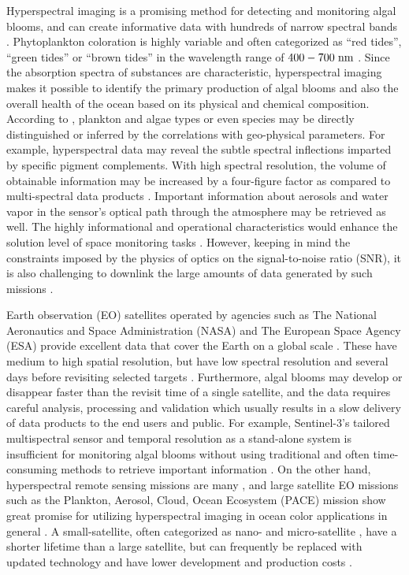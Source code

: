 Hyperspectral imaging is a promising method for detecting and monitoring algal blooms, and can create informative data with hundreds of narrow spectral bands \cite{Kutser2006}. Phytoplankton coloration is highly variable and often categorized as “red tides”, “green tides” or “brown tides” in the wavelength range of $400-700 \hspace{3pt} \rm{nm}$ \cite{Kutser2006, Johnsen1997, Geir2011, IOCCG2014}. Since the absorption spectra of substances are characteristic, hyperspectral imaging makes it possible to identify the primary production of algal blooms and also the overall health of the ocean based on its physical and chemical composition. According to \cite{IOCCG2014}, plankton and algae types or even species may be directly distinguished or inferred by the correlations with geo-physical parameters. For example, hyperspectral data may reveal the subtle spectral inflections imparted by specific pigment complements. With high spectral resolution, the volume of obtainable information may be increased by a four-figure factor as compared to multi-spectral data products \cite{Ortenberg2011}. Important information about aerosols and water vapor in the sensor's optical path through the atmosphere may be retrieved as well. The highly informational and operational characteristics would enhance the solution level of space monitoring tasks \cite{Villafranca2012}. However, keeping in mind the constraints imposed by the physics of optics on the signal-to-noise ratio (SNR), it is also challenging to downlink the large amounts of data generated by such missions \cite{guelman2009small}. 

Earth observation (EO) satellites operated by agencies such as The National Aeronautics and Space Administration (NASA)  and The European Space Agency (ESA) provide excellent data that cover the Earth on a global scale \cite{knight2014,Aguirre2007}. These have medium to high spatial resolution, but have low spectral resolution and several days before revisiting selected targets \cite{Ack16}. Furthermore, algal blooms may develop or disappear faster than the revisit time of a single satellite, and the data requires careful analysis, processing and validation which usually results in a slow delivery of data products to the end users and public. For example, Sentinel-3’s tailored multispectral sensor and temporal resolution as a stand-alone system is insufficient for monitoring algal blooms without using traditional and often time-consuming methods to retrieve important information \cite{Ogashawara2019}. On the other hand, hyperspectral remote sensing missions are many \cite{Gue16, Sou16, dierssen2015space, Guanter2015, 2014RemS66790M, Keith14, guelman2009small, pearlman2003}, and large satellite EO missions such as the Plankton, Aerosol, Cloud, Ocean Ecosystem (PACE) mission show great promise for utilizing hyperspectral imaging in ocean color applications in general \cite{Werdell2019}.  A small-satellite, often categorized as nano- and micro-satellite \cite{Gue16}, have a shorter lifetime than a large satellite, but can frequently be replaced with updated technology and have lower development and production costs \cite{modern_small_satellites}. 

